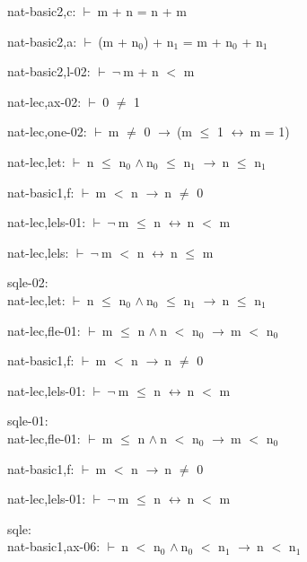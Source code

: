 \documentclass[a4paper]{article}
\newcommand{\Fol}{\mbox{$\vdash\ $}}
\newcommand{\Not}{\mbox{$\neg\ $}}
\newcommand{\And}{\mbox{$\wedge\ $}}
\newcommand{\Imp}{\mbox{$\rightarrow\ $}}
\newcommand{\Equiv}{\mbox{$\leftrightarrow\ $}}
\begin{document}
nat-basic2,c: 
 \Fol m + n = n + m



nat-basic2,a: 
 \Fol (m + $\mbox{n}_{0}$) + $\mbox{n}_{1}$ = m + $\mbox{n}_{0}$ + $\mbox{n}_{1}$



nat-basic2,l-02: 
 \Fol \Not m + n $<$ m



nat-lec,ax-02: 
 \Fol 0 $\neq$ 1



nat-lec,one-02: 
 \Fol m $\neq$ 0 \Imp (m $\le$ 1 \Equiv m = 1)



nat-lec,let: 
 \Fol n $\le$ $\mbox{n}_{0}$ \And $\mbox{n}_{0}$ $\le$ $\mbox{n}_{1}$ \Imp n $\le$ $\mbox{n}_{1}$



nat-basic1,f: 
 \Fol m $<$ n \Imp n $\neq$ 0



nat-lec,lels-01: 
 \Fol \Not m $\le$ n \Equiv n $<$ m



nat-lec,lels: 
 \Fol \Not m $<$ n \Equiv n $\le$ m



\bigskip

sqle-02:\\ nat-lec,let: 
 \Fol n $\le$ $\mbox{n}_{0}$ \And $\mbox{n}_{0}$ $\le$ $\mbox{n}_{1}$ \Imp n $\le$ $\mbox{n}_{1}$



nat-lec,fle-01: 
 \Fol m $\le$ n \And n $<$ $\mbox{n}_{0}$ \Imp m $<$ $\mbox{n}_{0}$



nat-basic1,f: 
 \Fol m $<$ n \Imp n $\neq$ 0



nat-lec,lels-01: 
 \Fol \Not m $\le$ n \Equiv n $<$ m



\bigskip

sqle-01:\\ nat-lec,fle-01: 
 \Fol m $\le$ n \And n $<$ $\mbox{n}_{0}$ \Imp m $<$ $\mbox{n}_{0}$



nat-basic1,f: 
 \Fol m $<$ n \Imp n $\neq$ 0



nat-lec,lels-01: 
 \Fol \Not m $\le$ n \Equiv n $<$ m



\bigskip

sqle:\\ nat-basic1,ax-06: 
 \Fol n $<$ $\mbox{n}_{0}$ \And $\mbox{n}_{0}$ $<$ $\mbox{n}_{1}$ \Imp n $<$ $\mbox{n}_{1}$
\end{document}
